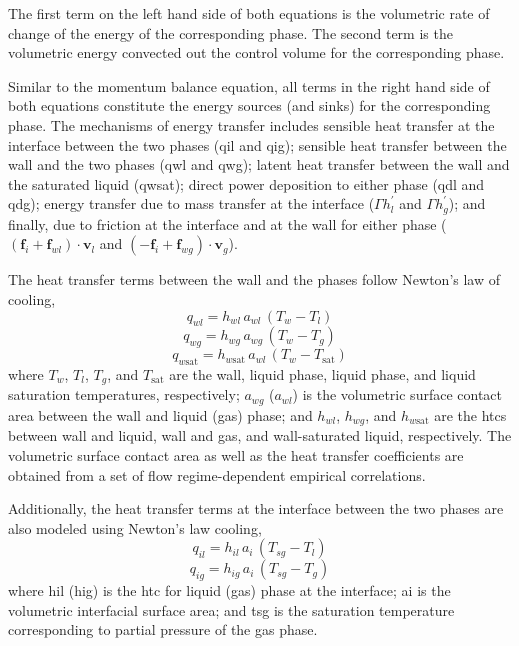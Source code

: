 The first term on the left hand side of both equations is the volumetric rate of change of the energy of the corresponding phase.
The second term is the volumetric energy convected out the control volume for the corresponding phase.

Similar to the momentum balance equation, all terms in the right hand side of both equations constitute the energy sources (and sinks) for the corresponding phase.
The mechanisms of energy transfer includes sensible heat transfer at the interface between the two phases (\gls{qil} and \gls{qig});  
sensible heat transfer between the wall and the two phases (\gls{qwl} and \gls{qwg});
latent heat transfer between the wall and the saturated liquid (\gls{qwsat});
direct power deposition to either phase (\gls{qdl} and \gls{qdg});
energy transfer due to mass transfer at the interface ($\Gamma h^\prime_l$ and $\Gamma h^\prime_g$); 
and finally, due to friction at the interface and at the wall for either phase ($(\mathbf{f}_{i} + \mathbf{f}_{wl}) \cdot \mathbf{v}_l$ and $(-\mathbf{f}_{i} + \mathbf{f}_{wg}) \cdot \mathbf{v}_g$).

The heat transfer terms between the wall and the phases follow Newton's law of cooling,
\begin{equation}
	q_{wl} = h_{wl} \, a_{wl} \, (T_w - T_l)
\label{eq:qwl}
\end{equation}
\begin{equation}
	q_{wg} = h_{wg} \, a_{wg} \, (T_w - T_g)
\label{eq:qwg}
\end{equation}
\begin{equation}
	q_{w\text{sat}} = h_{w\text{sat}} \, a_{wl} \, (T_w - T_\text{sat})
\label{eq:qwsat}
\end{equation}
where $T_w$, $T_l$, $T_g$, and $T_\text{sat}$ are the wall, liquid phase, liquid phase, and liquid saturation temperatures, respectively;
$a_{wg}$ ($a_{wl}$) is the volumetric surface contact area between the wall and liquid (gas) phase;
and $h_{wl}$, $h_{wg}$, and $h_{w\text{sat}}$ are the \glspl{htc} between wall and liquid, wall and gas, and wall-saturated liquid, respectively.
The volumetric surface contact area as well as the heat transfer coefficients are obtained from a set of flow regime-dependent empirical correlations.

Additionally, the heat transfer terms at the interface between the two phases are also modeled using Newton's law cooling,
\begin{equation}
	q_{il} = h_{il} \, a_{i} \, (T_{sg} - T_l)
\label{eq:qil}
\end{equation}
\begin{equation}
	q_{ig} = h_{ig} \, a_{i} \, (T_{sg} - T_g)
\label{eq:qig}
\end{equation}
where \gls{hil} (\gls{hig}) is the \gls{htc} for liquid (gas) phase at the interface;
\gls{ai} is the volumetric interfacial surface area;
and \gls{tsg} is the saturation temperature corresponding to partial pressure of the gas phase.

